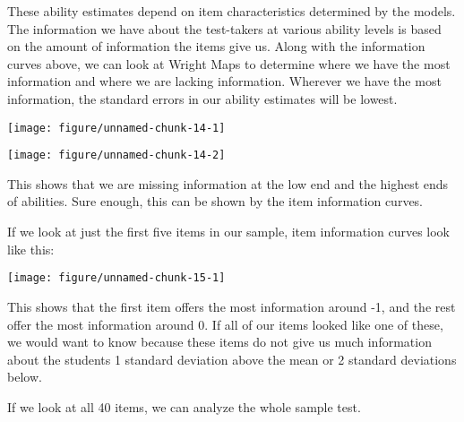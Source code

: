 \documentclass{article}\usepackage[]{graphicx}\usepackage[]{color}
\makeatletter
\def\maxwidth{ %
  \ifdim\Gin@nat@width>\linewidth
    \linewidth
  \else
    \Gin@nat@width
  \fi
}
\newenvironment{knitrout}{}{} %
\makeatother
\begin{document}
\begin{enumerate}
These ability estimates depend on item characteristics determined by the models. The information we have about the test-takers at various ability levels is based on the amount of information the items give us. Along with the information curves above, we can look at Wright Maps to determine where we have the most information and where we are lacking information. Wherever we have the most information, the standard errors in our ability estimates will be lowest.

\centering
\begin{knitrout}
\color{fgcolor}

{\centering \texttt{[image: figure/unnamed-chunk-14-1]} 

}




{\centering \texttt{[image: figure/unnamed-chunk-14-2]} 

}



\end{knitrout}
\raggedright
This shows that we are missing information at the low end and the highest ends of abilities. Sure enough, this can be shown by the item information curves.

\raggedright
If we look at just the first five items in our sample, item information curves look like this:

\centering
\begin{knitrout}
\color{fgcolor}

{\centering \texttt{[image: figure/unnamed-chunk-15-1]} 

}



\end{knitrout}
\raggedright
This shows that the first item offers the most information around -1, and the rest offer the most information around 0. If all of our items looked like one of these, we would want to know because these items do not give us much information about the students 1 standard deviation above the mean or 2 standard deviations below. 
\raggedright

If we look at all 40 items, we can analyze the whole sample test.

\centering
\begin{knitrout}
\color{fgcolor}


\end{knitrout}
\end{enumerate}
\end{document}
